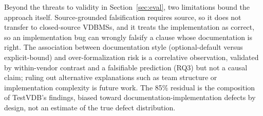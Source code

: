 \documentclass[sigconf]{acmart}
\begin{document}
Beyond the threats to validity in Section~\ref{sec:eval}, two limitations bound the approach itself. Source-grounded falsification requires source, so it does not transfer to closed-source VDBMSs, and it treats the implementation as correct, so an implementation bug can wrongly falsify a clause whose documentation is right. The association between documentation style (optional-default versus explicit-bound) and over-formalization risk is a correlative observation, validated by within-vendor contrast and a falsifiable prediction (RQ3) but not a causal claim; ruling out alternative explanations such as team structure or implementation complexity is future work. The 85\% residual is the composition of TestVDB's findings, biased toward documentation-implementation defects by design, not an estimate of the true defect distribution.
\end{document}

